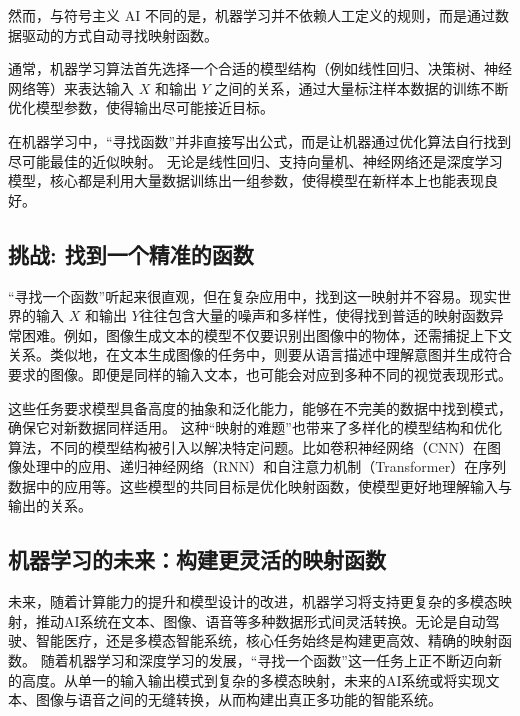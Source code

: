 然而，与符号主义 AI 不同的是，机器学习并不依赖人工定义的规则，而是通过数据驱动的方式自动寻找映射函数。

通常，机器学习算法首先选择一个合适的模型结构（例如线性回归、决策树、神经网络等）来表达输入 $X$ 和输出 $Y$ 之间的关系，通过大量标注样本数据的训练不断优化模型参数，使得输出尽可能接近目标。%

在机器学习中，“寻找函数”并非直接写出公式，而是让机器通过优化算法自行找到尽可能最佳的近似映射。
无论是线性回归、支持向量机、神经网络还是深度学习模型，核心都是利用大量数据训练出一组参数，使得模型在新样本上也能表现良好。%

\subsection{挑战: 找到一个精准的函数}


“寻找一个函数”听起来很直观，但在复杂应用中，找到这一映射并不容易。现实世界的输入 $X$ 和输出 $Y$往往包含大量的噪声和多样性，使得找到普适的映射函数异常困难。例如，图像生成文本的模型不仅要识别出图像中的物体，还需捕捉上下文关系。类似地，在文本生成图像的任务中，则要从语言描述中理解意图并生成符合要求的图像。即便是同样的输入文本，也可能会对应到多种不同的视觉表现形式。

这些任务要求模型具备高度的抽象和泛化能力，能够在不完美的数据中找到模式，确保它对新数据同样适用。
这种“映射的难题”也带来了多样化的模型结构和优化算法，不同的模型结构被引入以解决特定问题。比如卷积神经网络（CNN）在图像处理中的应用、递归神经网络（RNN）和自注意力机制（Transformer）在序列数据中的应用等。这些模型的共同目标是优化映射函数，使模型更好地理解输入与输出的关系。


\subsection{机器学习的未来：构建更灵活的映射函数}

未来，随着计算能力的提升和模型设计的改进，机器学习将支持更复杂的多模态映射，推动AI系统在文本、图像、语音等多种数据形式间灵活转换。无论是自动驾驶、智能医疗，还是多模态智能系统，核心任务始终是构建更高效、精确的映射函数。
随着机器学习和深度学习的发展，“寻找一个函数”这一任务上正不断迈向新的高度。从单一的输入输出模式到复杂的多模态映射，未来的AI系统或将实现文本、图像与语音之间的无缝转换，从而构建出真正多功能的智能系统。
